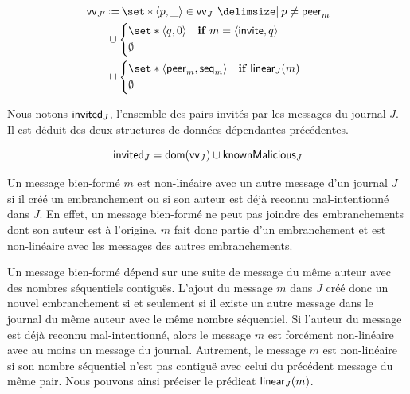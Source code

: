 \begin{equation*}\begin{split}
\MoveEqLeft\trm{vv}_{J'} \assign \set*{\tuple{p, \_} \in \trm{vv}_J \given p \neq \trm{peer}_m}\\
&\cup \begin{dcases}
        \set*{\tuple{q, 0}} & \when m = \tuple{\trm{invite}, q}\\
        \emptyset &
    \end{dcases}\\
&\cup \begin{dcases}
        \set*{\tuple{\trm{peer}_m, \trm{seq}_m}} & \when \trm{linear}_J(m)\\
        \emptyset &
    \end{dcases}
\end{split}\end{equation*}

Nous notons $\operatorname{\mathsf{invited}}_J$, l'ensemble des pairs invités par les messages du journal $J$.
Il est déduit des deux structures de données dépendantes précédentes.

\begin{equation*}
    \operatorname{\mathsf{invited}}_{J} = \operatorname{\mathsf{dom}}(\operatorname{\mathsf{vv}}_J) \cup \operatorname{\mathsf{knownMalicious}}_J
\end{equation*}


Un message bien-formé $m$ est non-linéaire avec un autre message d'un journal $J$ si il créé un embranchement ou si son auteur est déjà reconnu mal-intentionné dans $J$.
En effet, un message bien-formé ne peut pas joindre des embranchements dont son auteur est à l'origine.
$m$ fait donc partie d'un embranchement et est non-linéaire avec les messages des autres embranchements.

Un message bien-formé dépend sur une suite de message du même auteur avec des nombres séquentiels contiguës.
L'ajout du message $m$ dans $J$ créé donc un nouvel embranchement si et seulement si il existe un autre message dans le journal du même auteur avec le même nombre séquentiel.
Si l'auteur du message est déjà reconnu mal-intentionné, alors le message $m$ est forcément non-linéaire avec au moins un message du journal.
Autrement, le message $m$ est non-linéaire si son nombre séquentiel n'est pas contiguë avec celui du précédent message du même pair.
Nous pouvons ainsi préciser le prédicat $\operatorname{\mathsf{linear}}_J(m)$.

